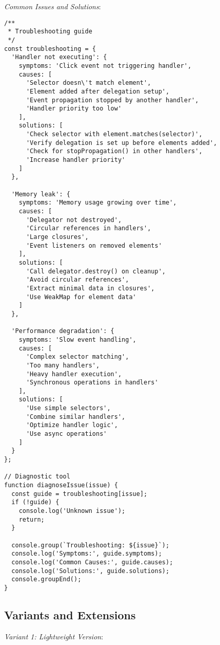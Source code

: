 \documentclass[11pt]{article}
\begin{document}
\emph{Common Issues and Solutions}:

\begin{verbatim}
/**
 * Troubleshooting guide
 */
const troubleshooting = {
  'Handler not executing': {
    symptoms: 'Click event not triggering handler',
    causes: [
      'Selector doesn\'t match element',
      'Element added after delegation setup',
      'Event propagation stopped by another handler',
      'Handler priority too low'
    ],
    solutions: [
      'Check selector with element.matches(selector)',
      'Verify delegation is set up before elements added',
      'Check for stopPropagation() in other handlers',
      'Increase handler priority'
    ]
  },
  
  'Memory leak': {
    symptoms: 'Memory usage growing over time',
    causes: [
      'Delegator not destroyed',
      'Circular references in handlers',
      'Large closures',
      'Event listeners on removed elements'
    ],
    solutions: [
      'Call delegator.destroy() on cleanup',
      'Avoid circular references',
      'Extract minimal data in closures',
      'Use WeakMap for element data'
    ]
  },
  
  'Performance degradation': {
    symptoms: 'Slow event handling',
    causes: [
      'Complex selector matching',
      'Too many handlers',
      'Heavy handler execution',
      'Synchronous operations in handlers'
    ],
    solutions: [
      'Use simple selectors',
      'Combine similar handlers',
      'Optimize handler logic',
      'Use async operations'
    ]
  }
};

// Diagnostic tool
function diagnoseIssue(issue) {
  const guide = troubleshooting[issue];
  if (!guide) {
    console.log('Unknown issue');
    return;
  }
  
  console.group(`Troubleshooting: ${issue}`);
  console.log('Symptoms:', guide.symptoms);
  console.log('Common Causes:', guide.causes);
  console.log('Solutions:', guide.solutions);
  console.groupEnd();
}
\end{verbatim}
\subsection{Variants and Extensions}
\label{sec:orgba362cb}

\emph{Variant 1: Lightweight Version}:
\end{document}
